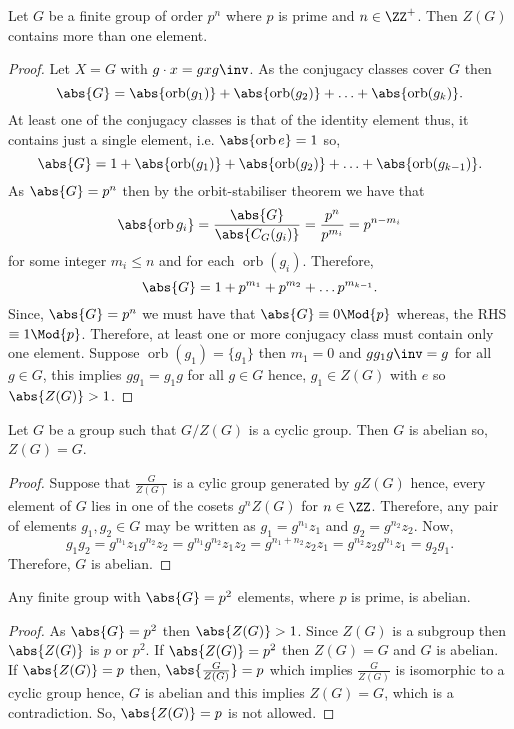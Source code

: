 \documentclass[12pt, a4paper]{article}
\DeclareMathOperator{\orb}{orb}
\begin{document}
\begin{mdthm}
    Let \(G\) be a finite group of order \(p^n\) where \(p\) is prime and \(n\in \ZZ^+\). Then \(Z(G)\) contains more than one element.
\end{mdthm}

\begin{proof}
    Let \(X=G\) with \(g \cdot x =gxg\inv\). As the conjugacy classes cover \(G\) then
    \[\abs{G}=\abs{\orb(g_1)}+\abs{\orb(g_2)}+\ldots +\abs{\orb(g_k)}.\]
    At least one of the conjugacy classes is that of the identity element thus, it contains just a single element, i.e. \(\abs{\orb{e}}=1\) so,
    \[\abs{G}=1+\abs{\orb(g_1)}+\abs{\orb(g_2)}+\ldots +\abs{\orb(g_{k-1})}.\]
    As \(\abs{G}=p^n\) then by the orbit-stabiliser theorem we have that 
    \[\abs{\orb{g_i}}=\frac{\abs{G}}{\abs{C_G(g_i)}} =\frac{p^n}{p^{m_i}}=p^{n-m_i}\]
    for some integer \(m_i \leq n\) and for each \(\orb(g_i)\).
    Therefore,
    \[\abs{G}=1+p^{m_1}+p^{m_2}+\ldots p^{m_{k-1}}.\]
    Since, \(\abs{G}=p^n\) we must have that \(\abs{G}\equiv 0 \Mod{p}\) whereas, the RHS \(\equiv 1 \Mod{p}\). Therefore, at least one or more conjugacy class must contain only one element. Suppose \(\orb(g_1)=\{g_1\}\) then \(m_1=0\) and \(gg_1g\inv =g\) for all \(g \in G\), this implies \(gg_1=g_1g\) for all \(g \in G\) hence, \(g_1 \in Z(G)\) with \(e\) so \(\abs{Z(G)}>1\).
\end{proof}

\begin{theorem}
    Let \(G\) be a group such that \(G / Z(G)\) is a cyclic group. Then \(G\) is abelian so, \(Z(G)=G\).
\end{theorem}

\begin{proof}
    Suppose that \(\frac{G}{Z(G)}\) is a cylic group generated by \(gZ(G)\) hence, every element of \(G\) lies in one of the cosets \(g^n Z(G)\) for \(n \in \ZZ\). Therefore, any pair of elements \(g_1,g_2 \in G\) may be written as \(g_1 = g^{n_1}z_1\) and \(g_2 =g^{n_2}z_2\). Now,
    \[g_1g_2=g^{n_1}z_1g^{n_2}z_2=g^{n_1}g^{n_2}z_1z_2=g^{n_1+n_2}z_2z_1=g^{n_2}z_2g^{n_1}z_1=g_2g_1.\]
    Therefore, \(G\) is abelian.
\end{proof}

\begin{mdthm}
    Any finite group with \(\abs{G}=p^2\) elements, where \(p\) is prime, is abelian.
\end{mdthm}

\begin{proof}
    As \(\abs{G}=p^2\) then \(\abs{Z(G)}>1\). Since \(Z(G)\) is a subgroup then \(\abs{Z(G)}\) is \(p\) or \(p^2\). If \(\abs{Z(G)}=p^2\) then \(Z(G)=G\) and \(G\) is abelian. If \(\abs{Z(G)}=p\) then, \(\abs{\frac{G}{Z(G)}} =p\) which implies \(\frac{G}{Z(G)}\) is isomorphic to a cyclic group hence, \(G\) is abelian and this implies \(Z(G)=G\), which is a contradiction. So, \(\abs{Z(G)}=p\) is not allowed.
\end{proof}
\end{document}
